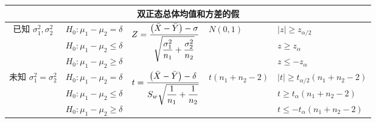 \begin{table}[H]
{\begin{tabular}{cccll}
            \midrule
            \multicolumn{5}{c}{双正态总体均值和方差的假}                                                                                                                                                                                                                                                                                           \\
            \midrule
            \multirow{3}{*}{已知 $\sigma_1^2,\sigma_2^2$} & $H_0:\mu_1-\mu_2=\delta$             & \multirow{3}{*}{$Z=\dfrac{\qty(\bar{X}-\bar{Y})-\sigma}{\sqrt{\dfrac{\sigma_1^2}{n_1}+\dfrac{\sigma_2^2}{n_2}}}$} & \multirow{3}{*}{$N(0,1)$}                                                        & $|z|\geqslant z_{\alpha/2}$              \\
                                                          & $H_0:\mu_1-\mu_2\leqslant \delta$    &                                                                                                                   &                                                                                  & $z\geqslant z_\alpha$                    \\
                                                          & $H_0:\mu_1-\mu_2\geqslant \delta$    &                                                                                                                   &                                                                                  & $z\leqslant -z_\alpha $                  \\
            \midrule
            \multirow{3}{*}{未知 $\sigma_1^2=\sigma_2^2$} & $H_0:\mu_1-\mu_2=\delta$             & \multirow{3}{*}{$t=\dfrac{\qty(\bar{X}-\bar{Y})-\delta}{S_w\sqrt{\dfrac{1}{n_1}+\dfrac{1}{n_2}}}$}                & \multirow{3}{*}{$t(n_1+n_2-2)$}                                                  & $|t|\geqslant t_{\alpha/2}(n_1+n_2-2)$   \\
                                                          & $H_0:\mu_1-\mu_2\leqslant \delta$    &                                                                                                                   &                                                                                  & $t\geqslant t_{\alpha}(n_1+n_2-2)$       \\
                                                          & $H_0:\mu_1-\mu_2\geqslant \delta$    &                                                                                                                   &                                                                                  & $t\leqslant -t_{\alpha}(n_1+n_2-2)$      \\

\end{tabular}}
\end{table}
